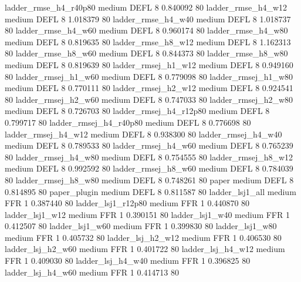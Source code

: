  ladder_rmse_h4_r40p80     medium     DEFL                 8 0.840092 80
    ladder_rmse_h4_w12     medium     DEFL                 8 1.018379 80
    ladder_rmse_h4_w40     medium     DEFL                 8 1.018737 80
    ladder_rmse_h4_w60     medium     DEFL                 8 0.960174 80
    ladder_rmse_h4_w80     medium     DEFL                 8 0.819635 80
    ladder_rmse_h8_w12     medium     DEFL                 8 1.162313 80
    ladder_rmse_h8_w60     medium     DEFL                 8 0.844373 80
    ladder_rmse_h8_w80     medium     DEFL                 8 0.819639 80
   ladder_rmsej_h1_w12     medium     DEFL                 8 0.949160 80
   ladder_rmsej_h1_w60     medium     DEFL                 8 0.779098 80
   ladder_rmsej_h1_w80     medium     DEFL                 8 0.770111 80
   ladder_rmsej_h2_w12     medium     DEFL                 8 0.924541 80
   ladder_rmsej_h2_w60     medium     DEFL                 8 0.747033 80
   ladder_rmsej_h2_w80     medium     DEFL                 8 0.726703 80
ladder_rmsej_h4_r12p80     medium     DEFL                 8 0.799717 80
ladder_rmsej_h4_r40p80     medium     DEFL                 8 0.776698 80
   ladder_rmsej_h4_w12     medium     DEFL                 8 0.938300 80
   ladder_rmsej_h4_w40     medium     DEFL                 8 0.789533 80
   ladder_rmsej_h4_w60     medium     DEFL                 8 0.765239 80
   ladder_rmsej_h4_w80     medium     DEFL                 8 0.754555 80
   ladder_rmsej_h8_w12     medium     DEFL                 8 0.992592 80
   ladder_rmsej_h8_w60     medium     DEFL                 8 0.784039 80
   ladder_rmsej_h8_w80     medium     DEFL                 8 0.748261 80
                 paper     medium     DEFL                 8 0.814895 80
          paper_plugin     medium     DEFL                 8 0.811587 80
       ladder_lsj1_all     medium      FFR                 1 0.387440 80
    ladder_lsj1_r12p80     medium      FFR                 1 0.440870 80
       ladder_lsj1_w12     medium      FFR                 1 0.390151 80
       ladder_lsj1_w40     medium      FFR                 1 0.412507 80
       ladder_lsj1_w60     medium      FFR                 1 0.399830 80
       ladder_lsj1_w80     medium      FFR                 1 0.405732 80
     ladder_lsj_h2_w12     medium      FFR                 1 0.406530 80
     ladder_lsj_h2_w60     medium      FFR                 1 0.401722 80
     ladder_lsj_h4_w12     medium      FFR                 1 0.409030 80
     ladder_lsj_h4_w40     medium      FFR                 1 0.396825 80
     ladder_lsj_h4_w60     medium      FFR                 1 0.414713 80
